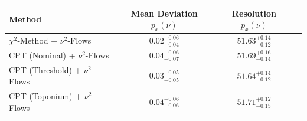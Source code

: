     \begin{tabular}{lccc}
        \toprule
        Method & Mean Deviation $p_{x}(\nu)$ & Resolution $p_{x}(\nu)$ \\
        \midrule
        $\chi^2$-Method + $\nu^2$-Flows & $0.02^{+0.06}_{-0.04}$ & $51.63^{+0.14}_{-0.12}$ \\
        CPT (Nominal) + $\nu^2$-Flows & $0.04^{+0.06}_{-0.07}$ & $51.69^{+0.16}_{-0.14}$ \\
        CPT (Threshold) + $\nu^2$-Flows & $0.03^{+0.05}_{-0.05}$ & $51.64^{+0.14}_{-0.12}$ \\
        CPT (Toponium) + $\nu^2$-Flows & $0.04^{+0.06}_{-0.06}$ & $51.71^{+0.12}_{-0.15}$ \\
        \bottomrule
    \end{tabular}